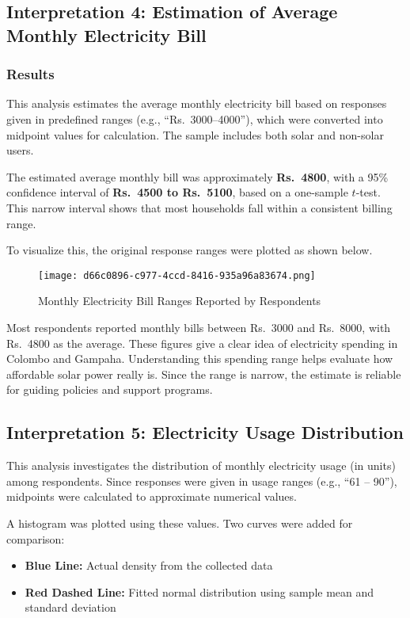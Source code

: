 \documentclass[12pt,a4paper]{article}
\begin{document}
\subsection{Interpretation 4: Estimation of Average Monthly Electricity Bill}

\subsubsection*{Results}

This analysis estimates the average monthly electricity bill based on responses given in predefined ranges (e.g., ``Rs.\ 3000--4000''), which were converted into midpoint values for calculation. The sample includes both solar and non-solar users.

The estimated average monthly bill was approximately \textbf{Rs.\ 4800}, with a 95\% confidence interval of \textbf{Rs.\ 4500 to Rs.\ 5100}, based on a one-sample $t$-test. This narrow interval shows that most households fall within a consistent billing range.

To visualize this, the original response ranges were plotted as shown below.

\begin{figure}[H]
  \centering
  \texttt{[image: d66c0896-c977-4ccd-8416-935a96a83674.png]}
  \caption{Monthly Electricity Bill Ranges Reported by Respondents}
  \label{fig:monthly-bill-bar}
\end{figure}

Most respondents reported monthly bills between Rs.\ 3000 and Rs.\ 8000, with Rs.\ 4800 as the average. These figures give a clear idea of electricity spending in Colombo and Gampaha. Understanding this spending range helps evaluate how affordable solar power really is. Since the range is narrow, the estimate is reliable for guiding policies and support programs.

\subsection{Interpretation 5: Electricity Usage Distribution}

This analysis investigates the distribution of monthly electricity usage (in units) among respondents. Since responses were given in usage ranges (e.g., ``61 -- 90''), midpoints were calculated to approximate numerical values.

A histogram was plotted using these values. Two curves were added for comparison:
\begin{itemize}
    \item \textbf{Blue Line:} Actual density from the collected data
    \item \textbf{Red Dashed Line:} Fitted normal distribution using sample mean and standard deviation
\end{itemize}
\end{document}
